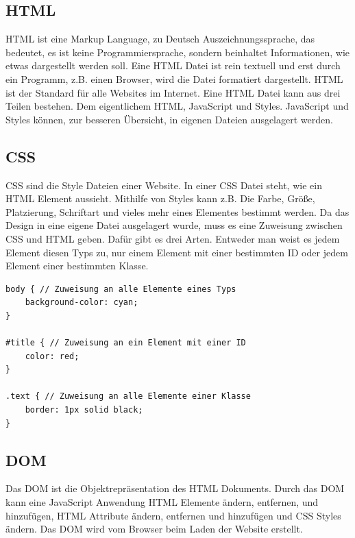 \subsection{HTML}
\label{sec:vor-html}
\ac{HTML} ist eine Markup Language, zu Deutsch Auszeichnungssprache, das bedeutet, es ist keine Programmiersprache, sondern beinhaltet Informationen, wie etwas dargestellt werden soll. Eine \ac{HTML} Datei ist rein textuell und erst durch ein Programm, z.B. einen Browser, wird die Datei formatiert dargestellt. \ac{HTML} ist der Standard für alle Websites im Internet. Eine \ac{HTML} Datei kann aus drei Teilen bestehen. Dem eigentlichem \ac{HTML}, JavaScript und Styles. JavaScript und Styles können, zur besseren Übersicht, in eigenen Dateien ausgelagert werden.

\subsection{CSS}
\ac{CSS} sind die Style Dateien einer Website. In einer \ac{CSS} Datei steht, wie ein \ac{HTML} Element aussieht. Mithilfe von Styles kann z.B. Die Farbe, Größe, Platzierung, Schriftart und vieles mehr eines Elementes bestimmt werden. Da das Design in eine eigene Datei ausgelagert wurde, muss es eine Zuweisung zwischen \ac{CSS} und \ac{HTML} geben. Dafür gibt es drei Arten. Entweder man weist es jedem Element diesen Typs zu, nur einem Element mit einer bestimmten ID oder jedem Element einer bestimmten Klasse.

\begin{lstlisting}[caption=Zuweisen von Design an HTML,style=css,label=CSS-Beispiel]
body { // Zuweisung an alle Elemente eines Typs
	background-color: cyan;
}

#title { // Zuweisung an ein Element mit einer ID
	color: red;
}

.text { // Zuweisung an alle Elemente einer Klasse
	border: 1px solid black;
}
\end{lstlisting}


\subsection{DOM}
\label{sec:vor-dom}
Das \ac{DOM} ist die Objektrepräsentation des \ac{HTML} Dokuments. Durch das \ac{DOM} kann eine JavaScript Anwendung \ac{HTML} Elemente ändern, entfernen, und hinzufügen, \ac{HTML} Attribute ändern, entfernen und hinzufügen und \ac{CSS} Styles ändern. Das \ac{DOM} wird vom Browser beim Laden der Website erstellt. 

